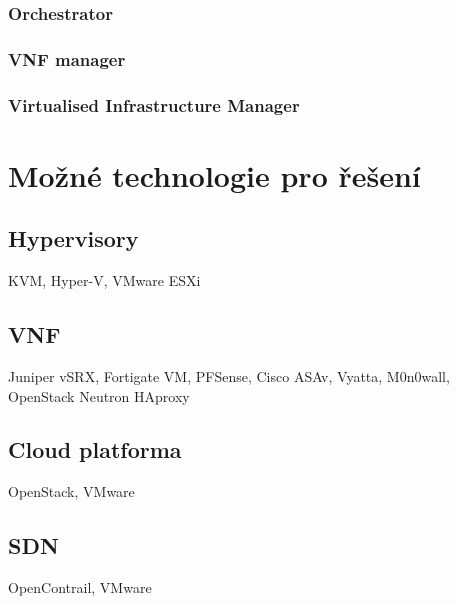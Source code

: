 	\subsubsection{Orchestrator}

	\subsubsection{VNF manager}

	\subsubsection{Virtualised Infrastructure Manager}

\section{Možné technologie pro řešení}

\subsection{Hypervisory} \label{sub:Hypervisor}

KVM, Hyper-V, VMware ESXi

\subsection{VNF}

Juniper vSRX, Fortigate VM, PFSense, Cisco ASAv, Vyatta, M0n0wall, OpenStack Neutron HAproxy

\subsection{Cloud platforma}

OpenStack, VMware

\subsection{SDN}

OpenContrail, VMware
